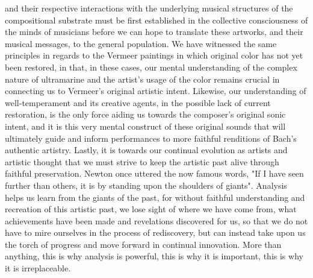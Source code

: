 and their respective interactions with the underlying musical structures
of the compositional substrate must be first established in the
collective consciousness of the minds of musicians before we can hope to
translate these artworks, and their musical messages, to the general
population. We have witnessed the same principles in regards to the
Vermeer paintings in which original color has not yet been restored, in
that, in these cases, our mental understanding of the complex nature of
ultramarine and the artist's usage of the color remains crucial in
connecting us to Vermeer's original artistic intent. Likewise, our
understanding of well-temperament and its creative agents, in the
possible lack of current restoration, is the only force aiding us
towards the composer's original sonic intent, and it is this very mental
construct of these original sounds that will ultimately guide and inform
performances to more faithful renditions of Bach's authentic artistry.
Lastly, it is towards our continual evolution as artists and artistic
thought that we must strive to keep the artistic past alive through
faithful preservation. Newton once uttered the now famous words, "If I
have seen further than others, it is by standing upon the shoulders of
giants". Analysis helps us learn from the giants of the past, for
without faithful understanding and recreation of this artistic past, we
lose sight of where we have come from, what achievements have been made
and revelations discovered for us, so that we do not have to mire
ourselves in the process of rediscovery, but can instead take upon us
the torch of progress and move forward in continual innovation. More
than anything, this is why analysis is powerful, this is why it is
important, this is why it is irreplaceable.

